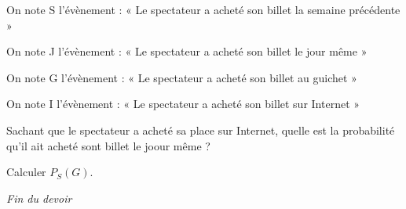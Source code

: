 \documentclass[12pt,a4paper]{exam}
\begin{document}
\vspace{5pt}
On note S l'évènement : « Le spectateur a acheté son billet la semaine précédente »

On note J l'évènement : « Le spectateur a acheté son billet le jour même »

On note G l'évènement : « Le spectateur a acheté son billet au guichet »

On note I l'évènement : « Le spectateur a acheté son billet sur Internet »


\begin{questions}

\question[2] Sachant que le spectateur a acheté sa place sur Internet, quelle est la probabilité 
qu'il ait acheté sont billet le joour même ?

\question[2] Calculer $P_{S}(G)$.

\end{questions}

\vspace{0.5cm}

\begin{center}
    \textit{Fin du devoir}
\end{center}
\end{document}
